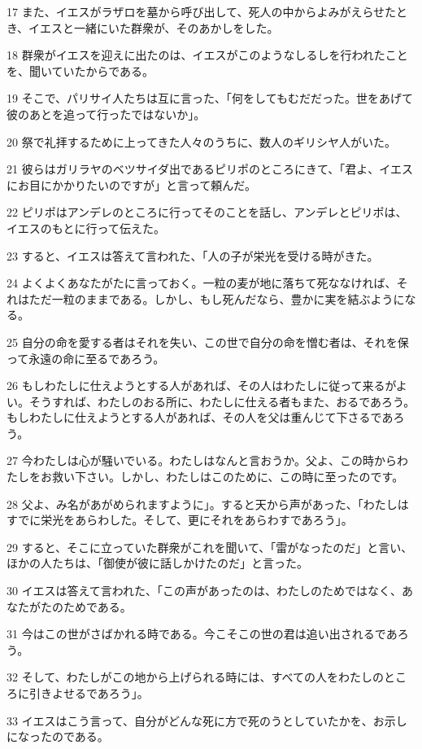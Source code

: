 \par 17 また、イエスがラザロを墓から呼び出して、死人の中からよみがえらせたとき、イエスと一緒にいた群衆が、そのあかしをした。
\par 18 群衆がイエスを迎えに出たのは、イエスがこのようなしるしを行われたことを、聞いていたからである。
\par 19 そこで、パリサイ人たちは互に言った、「何をしてもむだだった。世をあげて彼のあとを追って行ったではないか」。
\par 20 祭で礼拝するために上ってきた人々のうちに、数人のギリシヤ人がいた。
\par 21 彼らはガリラヤのベツサイダ出であるピリポのところにきて、「君よ、イエスにお目にかかりたいのですが」と言って頼んだ。
\par 22 ピリポはアンデレのところに行ってそのことを話し、アンデレとピリポは、イエスのもとに行って伝えた。
\par 23 すると、イエスは答えて言われた、「人の子が栄光を受ける時がきた。
\par 24 よくよくあなたがたに言っておく。一粒の麦が地に落ちて死ななければ、それはただ一粒のままである。しかし、もし死んだなら、豊かに実を結ぶようになる。
\par 25 自分の命を愛する者はそれを失い、この世で自分の命を憎む者は、それを保って永遠の命に至るであろう。
\par 26 もしわたしに仕えようとする人があれば、その人はわたしに従って来るがよい。そうすれば、わたしのおる所に、わたしに仕える者もまた、おるであろう。もしわたしに仕えようとする人があれば、その人を父は重んじて下さるであろう。
\par 27 今わたしは心が騒いでいる。わたしはなんと言おうか。父よ、この時からわたしをお救い下さい。しかし、わたしはこのために、この時に至ったのです。
\par 28 父よ、み名があがめられますように」。すると天から声があった、「わたしはすでに栄光をあらわした。そして、更にそれをあらわすであろう」。
\par 29 すると、そこに立っていた群衆がこれを聞いて、「雷がなったのだ」と言い、ほかの人たちは、「御使が彼に話しかけたのだ」と言った。
\par 30 イエスは答えて言われた、「この声があったのは、わたしのためではなく、あなたがたのためである。
\par 31 今はこの世がさばかれる時である。今こそこの世の君は追い出されるであろう。
\par 32 そして、わたしがこの地から上げられる時には、すべての人をわたしのところに引きよせるであろう」。
\par 33 イエスはこう言って、自分がどんな死に方で死のうとしていたかを、お示しになったのである。

